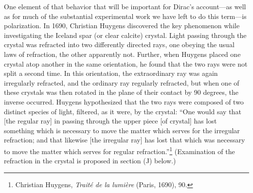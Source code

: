 One element of that behavior that will be important for Dirac’s account---as well as for much of the substantial 
experimental work we have left to do this term---is polarization. In 1690, Christian Huygens discovered 
the key phenomenon while investigating the Iceland spar (or clear calcite) crystal. Light passing through the
crystal was refracted into two differently directed rays, one obeying the usual laws of refraction, the other apparently not. 
Further, when Huygens placed one crystal atop another in the same orientation, he found that the two rays were not split a second time. In this orientation, the extraordinary ray was again irregularly refracted, and the ordinary ray regularly refracted, but when one of these crystals was then rotated in the plane of their contact by 90 degrees, the inverse occurred. Huygens hypothesized that the two rays were composed of two distinct species of light, filtered, as it were, by the crystal: ``One would say that [the regular ray] in passing through the upper piece [of crystal] has lost something which is necessary to move the matter which serves for the irregular refraction; and that likewise [the irregular ray] has lost that which was necessary to move the matter which serves for regular refraction.''\footnote{Christian Huygens, \emph{Trait\'e de la lumi\`ere} (Paris, 1690), 90.} (Examination of the refraction in the crystal is proposed in section (J) below.)

